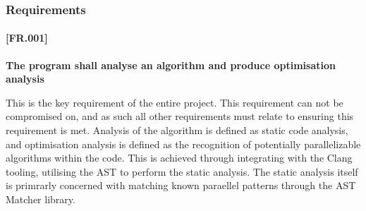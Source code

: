 \subsubsection{Requirements}

\paragraph{[FR.001]}
\textbf{The program shall analyse an algorithm and produce optimisation analysis}

This is the key requirement of the entire project. This requirement can not be compromised on, and as such all other requirements must relate to ensuring this requirement is met. Analysis of the algorithm is defined as static code analysis, and optimisation analysis is defined as the recognition of potentially parallelizable algorithms within the code. This is achieved through integrating with the Clang tooling, utilising the AST to perform the static analysis. The static analysis itself is primrarly concerned with matching known paraellel patterns through the AST Matcher library. 








